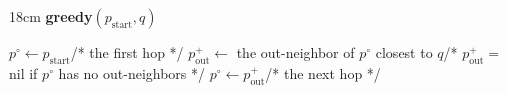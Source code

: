 \documentclass[border=8pt]{standalone}
\newcommand{\cmt}[1]{\quad\textrm{/* #1 */}}
\begin{document}
\begin{varwidth}{18cm}
{\bfseries greedy}$(p_{\mathrm{start}}, q)$\par\smallskip
\begin{algorithm}[H]
\DontPrintSemicolon
$p^{\circ} \leftarrow p_{\mathrm{start}}$\cmt{the first hop}\;
\;
\Indp
  $p^{+}_{\mathrm{out}} \leftarrow$ the out-neighbor of $p^{\circ}$ closest to $q$\cmt{$p^{+}_{\mathrm{out}}=$ nil if $p^{\circ}$ has no out-neighbors}\;
  $p^{\circ} \leftarrow p^{+}_{\mathrm{out}}$\cmt{the next hop}\;
\Indm
\end{algorithm}
\end{varwidth}
\end{document}
